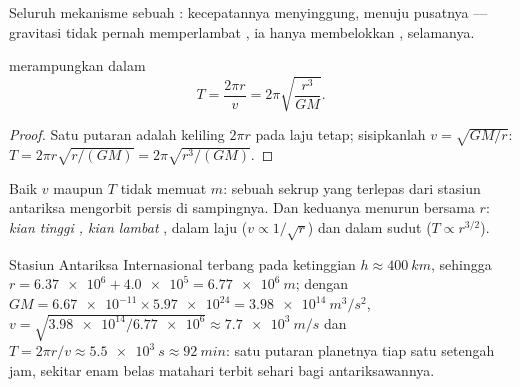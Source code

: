 \begin{omfigure}

{\small Seluruh mekanisme sebuah : kecepatannya menyinggung, 
menuju pusatnya --- gravitasi tidak pernah memperlambat , ia hanya
membelokkan , selamanya.}
\end{omfigure}

\begin{proposition}\label{prop:g12:satellites-kepler:period}
 merampungkan  dalam 
\[ T = \frac{2\pi r}{v} = 2\pi \sqrt{\frac{r^3}{G M}}. \]
\end{proposition}

\begin{proof}
Satu putaran adalah keliling $2\pi r$ pada laju tetap; sisipkanlah
$v = \sqrt{GM/r}$: $T = 2\pi r\sqrt{r/(GM)} = 2\pi\sqrt{r^3/(GM)}$.
\end{proof}

Baik $v$ maupun $T$ tidak memuat $m$: sebuah sekrup yang terlepas dari
stasiun antariksa mengorbit persis di sampingnya. Dan keduanya menurun
bersama $r$: \emph{kian tinggi , kian lambat }, dalam laju
($v \propto 1/\sqrt r$) dan dalam sudut ($T \propto r^{3/2}$).

\begin{example}\label{ex:g12:satellites-kepler:iss}
Stasiun Antariksa Internasional terbang pada ketinggian
$h \approx \qty{400}{km}$, sehingga $r = \num{6.37e6} + \num{4.0e5} =
\qty{6.77e6}{m}$; dengan $GM = \num{6.67e-11} \times \num{5.97e24} =
\qty{3.98e14}{m^3/s^2}$, $v = \sqrt{\num{3.98e14}/\num{6.77e6}}
\approx \qty{7.7e3}{m/s}$ dan $T = 2\pi r/v \approx \qty{5.5e3}{s}
\approx \qty{92}{min}$: satu putaran planetnya tiap satu setengah jam,
sekitar enam belas matahari terbit sehari bagi antariksawannya.
\end{example}

